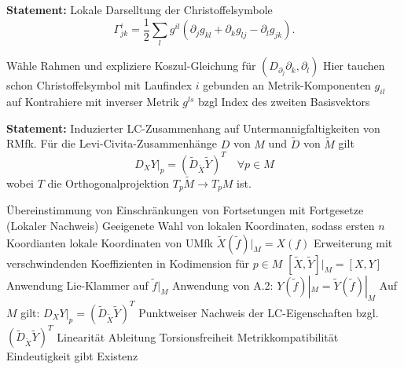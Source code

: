 \documentclass[10pt, letterpaper]{article}
\begin{document}
\vspace{0.5cm}


\textbf{Statement: } Lokale Darselltung der Christoffelsymbole
$$
\Gamma_{j k}^{i}=\frac{1}{2} \sum_{l} g^{i l}\left(\partial_{j} g_{k l}+\partial_{k} g_{l j}-\partial_{l} g_{j k}\right) .
$$

\StructurePic{}{}
{%
\begin{outline}
  \1 Wähle Rahmen und expliziere Koszul-Gleichung für $(D_{\partial_j}\partial_k,\partial_l)$
  \2 Hier tauchen schon Christoffelsymbol mit Laufindex $i$ gebunden an Metrik-Komponenten $g_{il}$ auf
  \1 Kontrahiere mit inverser Metrik $g^{ls}$ bzgl Index des zweiten Basisvektors
\end{outline}
}

\vspace{0.8cm}

\textbf{Statement: } {Induzierter LC-Zusammenhang auf Untermannigfaltigkeiten von RMfk}. 
Für die Levi-Civita-Zusammenhänge $D$ von $M$ und $\tilde{D}$ von $\tilde{M}$ gilt
\begin{equation*}
\left.D_{X} Y\right|_{p}=\left(\tilde{D}_{\tilde{X}} \tilde{Y}\right)^{T} \quad \forall p \in M 
\end{equation*}
wobei $T$ die Orthogonalprojektion $T_{p} \tilde{M} \rightarrow T_{p} M$ ist.

{%
\begin{outline}
  \1 Übereinstimmung von Einschränkungen von Fortsetungen mit Fortgesetze (Lokaler Nachweis)
  \2 Geeigenete Wahl von lokalen Koordinaten, sodass ersten $n$ Koordianten lokale Koordinaten von UMfk
  \2 $\tilde X(\tilde f)|_M= X(f)$ 
  \3 Erweiterung mit verschwindenden Koeffizienten in Kodimension für $p\in M$
  \2 $[\tilde X,\tilde Y]|_M= [X,Y]$
  \3 Anwendung Lie-Klammer auf $\tilde f|_M$
  \3 Anwendung von A.2: $Y(\tilde f)|_M=\tilde Y(\tilde f)|_M$
  \1 Auf $M$ gilt: $\left.D_{X} Y\right|_{p}=\left(\tilde{D}_{\tilde{X}} \tilde{Y}\right)^{T}$
  \2 Punktweiser Nachweis der LC-Eigenschaften bzgl. $\left(\tilde{D}_{\tilde{X}} \tilde{Y}\right)^{T}$
  \3 Linearität
  \3 Ableitung
  \3 Torsionsfreiheit
  \3 Metrikkompatibilität
  \2 Eindeutigkeit gibt Existenz
\end{outline}
}

\vspace{0.7cm}






\pagebreak
\end{document}
